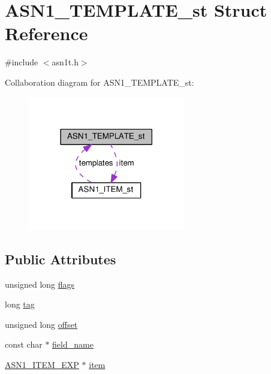 \hypertarget{struct_a_s_n1___t_e_m_p_l_a_t_e__st}{}\section{A\+S\+N1\+\_\+\+T\+E\+M\+P\+L\+A\+T\+E\+\_\+st Struct Reference}
\label{struct_a_s_n1___t_e_m_p_l_a_t_e__st}


{\ttfamily \#include $<$asn1t.\+h$>$}



Collaboration diagram for A\+S\+N1\+\_\+\+T\+E\+M\+P\+L\+A\+T\+E\+\_\+st\+:
\nopagebreak
\begin{figure}[H]
\begin{center}
\leavevmode
\includegraphics[width=194pt]{struct_a_s_n1___t_e_m_p_l_a_t_e__st__coll__graph}
\end{center}
\end{figure}
\subsection*{Public Attributes}
\begin{DoxyCompactItemize}
\item 
unsigned long \hyperlink{struct_a_s_n1___t_e_m_p_l_a_t_e__st_aadbe8b5ea9d41920c3fc59d6c65848a8}{flags}
\item 
long \hyperlink{struct_a_s_n1___t_e_m_p_l_a_t_e__st_a8ef37d4a92684f1305627489e11a6b2e}{tag}
\item 
unsigned long \hyperlink{struct_a_s_n1___t_e_m_p_l_a_t_e__st_a6fed94625b157be3f3513fda21ae464f}{offset}
\item 
const char $\ast$ \hyperlink{struct_a_s_n1___t_e_m_p_l_a_t_e__st_af497df5141e17637e18b4857c147ca73}{field\+\_\+name}
\item 
\hyperlink{asn1_8h_a66f9dbfa70a439af388cb82e0c764944}{A\+S\+N1\+\_\+\+I\+T\+E\+M\+\_\+\+E\+XP} $\ast$ \hyperlink{struct_a_s_n1___t_e_m_p_l_a_t_e__st_a1f27bffc57ff2163fb587c3da0cf1f9e}{item}
\end{DoxyCompactItemize}


